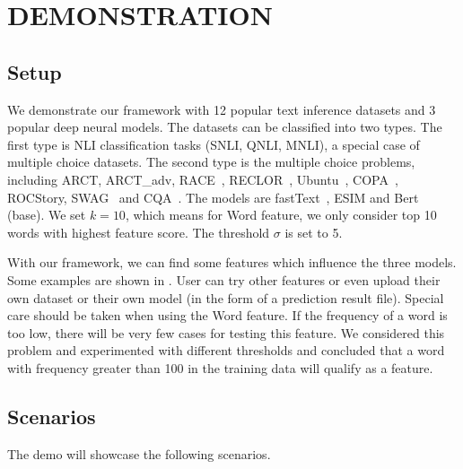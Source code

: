 \section{DEMONSTRATION}
\label{sec:demonstration}
\subsection{Setup} 
We demonstrate our framework 
with 12 popular text inference datasets and 3 popular deep neural models.
The datasets can be 
classified into two types. 
The first type is NLI classification tasks (SNLI, QNLI, MNLI), 
a special case of multiple choice datasets. 
The second type is the multiple choice problems, 
including ARCT, 
ARCT\_adv\cite{schuster2019towards}, 
RACE~\cite{lai2017race}, RECLOR~\cite{yu2020reclor}, 
Ubuntu~\cite{lowe2015ubuntu}, COPA~\cite{roemmele2011choice}, ROCStory, SWAG~\cite{zellers2018swag} and 
CQA~\cite{talmor2019commonsenseqa}.
The models are fastText~\cite{joulin2017bag}, ESIM and Bert (base).
We set $k = 10$, which means for Word feature, we only consider 
top 10 words with highest feature score. 
The threshold $\sigma$ is set to 5. 

With our framework, we can find some features which influence the 
three models. Some examples are shown in . 
User can try other features or even upload their own dataset or their own
model (in the form of a prediction result file). 
Special care should be taken when using the Word feature. 
If the frequency of a word is too low, there will be very few cases 
for testing this feature. We considered this 
problem and experimented with different thresholds and 
concluded that a word with frequency greater than 100 in the training data
will qualify as a feature. 

\subsection{Scenarios}
The demo will showcase the following scenarios.

